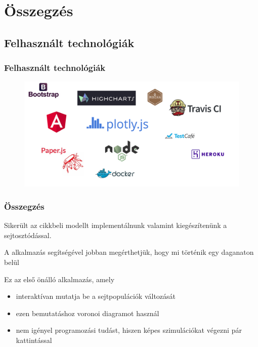 \section{Összegzés}

\subsection{Felhasznált technológiák}
\begin{frame}
	\frametitle{Felhasznált technológiák}
	\begin{figure}[ht!]
		\centering
		\includegraphics[width=\linewidth]{images/technologies}
	\end{figure}
\end{frame}

\begin{frame}
\frametitle{Összegzés}

\begin{block}{}
Sikerült az \cite{archetti2016cooperation} cikkbeli modellt implementálnunk valamint kiegészítenünk a sejtosztódással.
\end{block}
\begin{block}{}
A alkalmazás segítségével jobban megérthetjük, hogy mi történik egy daganaton belül
\end{block}

\pause
\begin{block}{Ez az első önálló alkalmazás, amely}
\begin{itemize}
	\item interaktívan mutatja be a sejtpopulációk változását
	\pause
	\item ezen bemutatáshoz voronoi diagramot használ
	\pause
	\item nem igényel programozási tudást, hiszen képes szimulációkat végezni pár kattintással
\end{itemize}
\end{block}
\end{frame}

